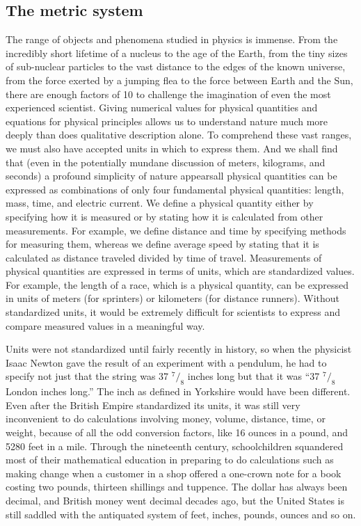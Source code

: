 \subsection{The metric system}
The range of objects and phenomena studied in physics is immense. From the incredibly short lifetime of a nucleus to the age of the Earth, from the tiny sizes of sub-nuclear particles to the vast distance to the edges of the known universe, from the force exerted by a jumping flea to the force between Earth and the Sun, there are enough factors of 10 to challenge the imagination of even the most experienced scientist. Giving numerical values for physical quantities and equations for physical principles allows us to understand nature much more deeply than does qualitative description alone. To comprehend these vast ranges, we must also have accepted units in which to express them. And we shall find that (even in the potentially mundane discussion of meters, kilograms, and seconds) a profound simplicity of nature appearsall physical quantities can be expressed as combinations of only four fundamental physical quantities: length, mass, time, and electric current. We define a physical quantity either by specifying how it is measured or by stating how it is calculated from other measurements. For example, we define distance and time by specifying methods for measuring them, whereas we define average speed by stating that it is calculated as distance traveled divided by time of travel.
Measurements of physical quantities are expressed in terms of units, which are standardized values. For example, the length of a race, which is a physical quantity, can be expressed in units of meters (for sprinters) or kilometers (for distance runners). Without standardized units, it would be
extremely difficult for scientists to express and compare measured values in a meaningful way.

Units were not standardized until fairly recently in
history, so when the physicist Isaac
Newton gave the result of an experiment with a pendulum, he
had to specify not just that the string was 37  $^7/_8$
inches long but that it was ``37  $^7/_8$ London inches
long.'' The inch as defined in Yorkshire would have been
different. Even after the British Empire standardized its
units, it was still very inconvenient to do calculations
involving money, volume, distance, time, or weight, because
of all the odd conversion factors, like 16 ounces in a
pound, and 5280 feet in a mile. Through the nineteenth
century, schoolchildren squandered most of their mathematical
education in preparing to do calculations such as making
change when a customer in a shop offered a one-crown note
for a book costing two pounds, thirteen shillings and
tuppence. The dollar has always been decimal, and British
money went decimal decades ago, but the United States is
still saddled with the antiquated system of feet, inches,
pounds, ounces and so on.

